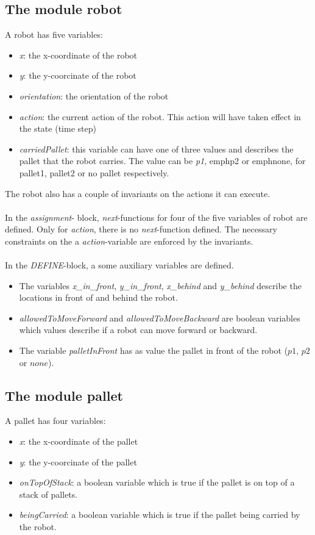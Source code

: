 \documentclass[10pt,a4paper]{article}
\begin{document}
\subsection*{The module robot}
A robot has five variables: 
\begin{itemize}
\item \emph{x}: the x-coordinate of the robot
\item \emph{y}: the y-coorcinate of the robot
\item \emph{orientation}: the orientation of the robot
\item \emph{action}: the current action of the robot.  This action will have taken effect in the state (time step)
\item \emph{carriedPallet}: this variable can have one of three values and describes the pallet that the robot carries. The value can be \emph{p1}, emph{p2} or emph{none}, for pallet1, pallet2 or no pallet respectively.
\end{itemize}
The robot also has a couple of invariants on the actions it can execute.\\
\\
In the \emph{assignment}- block, \emph{next}-functions for four of the five variables of robot are defined. Only for \emph{action}, there is no \emph{next}-function defined. The necessary constraints on the a \emph{action}-variable are enforced by the invariants.\\
\\
In the \emph{DEFINE}-block, a some auxiliary variables are defined.
\begin{itemize}

\item The variables \emph{x\_in\_front}, \emph{y\_in\_front}, \emph{x\_behind} and \emph{y\_behind} describe the locations in front of and behind the robot. 
\item \emph{allowedToMoveForward} and \emph{allowedToMoveBackward} are boolean variables which values describe if a robot can move forward or backward. 
\item The variable \emph{palletInFront} has as value the pallet in front of the robot ($p1$, $p2$ or $none$).
\end{itemize}

\subsection*{The module pallet}
A pallet has four variables: 
\begin{itemize}
\item \emph{x}: the x-coordinate of the pallet
\item \emph{y}: the y-coorcinate of the pallet
\item \emph{onTopOfStack}: a boolean variable which is true if the pallet is on top of a stack of pallets.
\item \emph{beingCarried}:  a boolean variable which is true if the pallet being carried by the robot.
\end{itemize}
\end{document}
